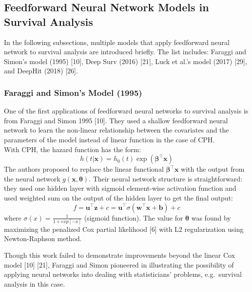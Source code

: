 \documentclass[
]{article}
\begin{document}
\hypertarget{feedforward-neural-network-models-in-survival-analysis}{%
\subsection{Feedforward Neural Network Models in Survival Analysis}\label{feedforward-neural-network-models-in-survival-analysis}}

In the following subsections, multiple models that apply feedforward neural network to survival analysis are introduced briefly. The list includes: Faraggi and Simon's model (1995) {[}10{]}, Deep Surv (2016) {[}21{]}, Luck et al.'s model (2017) {[}29{]}, and DeepHit (2018) {[}26{]}.

\hypertarget{faraggi-and-simons-model-1995}{%
\subsubsection{Faraggi and Simon's Model (1995)}\label{faraggi-and-simons-model-1995}}

One of the first applications of feedforward neural networks to survival analysis is from Faraggi and Simon 1995 {[}10{]}. They used a shallow feedforward neural network to learn the non-linear relationship between the covariates and the parameters of the model instead of linear function in the case of CPH.\\
With CPH, the hazard function has the form:
\[h(t|\mathbf{x}) = h_0(t)\exp(\mathbf{\boldsymbol\beta}^\intercal \mathbf{x})\]
The authors proposed to replace the linear functional \(\mathbf{\boldsymbol\beta}^\intercal \mathbf{x}\) with the output from the neural network \(g(\mathbf{x},\boldsymbol\theta)\). Their neural network structure is straightforward: they used one hidden layer with sigmoid element-wise activation function and used weighted sum on the output of the hidden layer to get the final output:
\[f = \mathbf{u}^\intercal\mathbf{z}+c=\mathbf{u}^\intercal\sigma(\mathbf{w}^\intercal\mathbf{x} + \mathbf{b}) + c\]
where \(\sigma(x)=\frac{1}{1+exp[-x]}\) (sigmoid function). The value for \(\boldsymbol\theta\) was found by maximizing the penalized Cox partial likelihood {[}6{]} with L2 regularization using Newton-Raphson method.

Though this work failed to demonstrate improvements beyond the linear Cox model {[}10{]} {[}21{]}, Faraggi and Simon pioneered in illustrating the possibility of applying neural networks into dealing with statisticians' problems, e.g.~survival analysis in this case.
\end{document}
